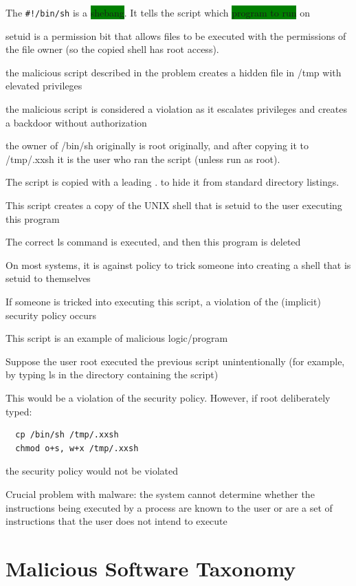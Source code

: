 \documentclass[]{project_plan}
\begin{document}
The \lstinline|#!/bin/sh| is a \colorbox{green}{shebang}. It tells the script which \colorbox{green}{program to run} on

setuid is a permission bit that allows files to be executed with
the permissions of the file owner (so the copied shell has root access).

the malicious script described in the
problem creates a hidden file in /tmp with elevated
privileges

the malicious script is considered a violation as it escalates privileges and creates a backdoor
without authorization

the owner of /bin/sh originally  is root originally, and after
copying it to /tmp/.xxsh  it is
the user who ran the script (unless run as root).

The script is copied with a leading . to hide it from standard directory listings.

This script creates a copy of the UNIX shell that is setuid to the user executing this program

The correct ls command is executed, and then this program is deleted

On most systems, it is against policy to trick someone into creating a shell that is
setuid to themselves

If someone is tricked into executing this script, a violation of the (implicit) security policy occurs

This script is an example of malicious logic/program

\newpage

Suppose the user root executed the previous script unintentionally (for example, by typing ls in
the directory containing the script)

This would be a violation of the security policy. However, if root deliberately typed:
\begin{lstlisting}
  cp /bin/sh /tmp/.xxsh
  chmod o+s, w+x /tmp/.xxsh
\end{lstlisting}
the security policy would not be violated

Crucial problem with malware: the system cannot determine whether the instructions
being executed by a process are known to the user or are a set of instructions that the user
does not intend to execute

\section{Malicious Software Taxonomy}
\end{document}
